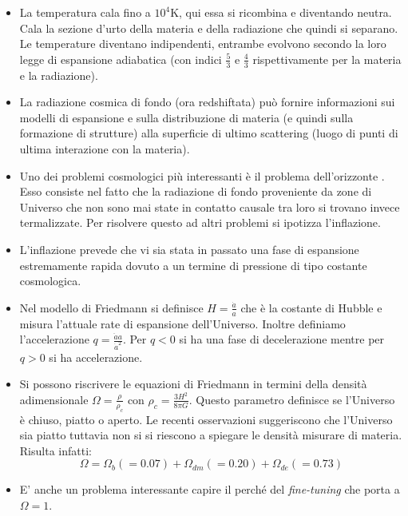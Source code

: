 \documentclass[11pt,a4paper]{article}
\begin{document}
\begin{itemize}
\item La temperatura cala fino a $10^4 \si{\kelvin}$, qui essa si ricombina e diventando neutra. Cala la sezione d'urto della materia e della radiazione che quindi si separano. Le temperature diventano indipendenti, entrambe evolvono secondo la loro legge di espansione adiabatica (con indici $\frac{5}{3}$ e $\frac{4}{3}$ rispettivamente per la materia e la radiazione).

\item La radiazione cosmica di fondo (ora redshiftata) può fornire informazioni sui modelli di espansione e sulla distribuzione di materia (e quindi sulla formazione di strutture) alla superficie di ultimo scattering (luogo di punti di ultima interazione con la materia). 

\item Uno dei problemi cosmologici più interessanti è il problema dell'orizzonte . Esso consiste nel fatto che la radiazione di fondo proveniente da zone di Universo che non sono mai state in contatto causale tra loro si trovano invece termalizzate. Per risolvere questo ad altri problemi si ipotizza l'inflazione.

\item L'inflazione prevede che vi sia stata in passato una fase di espansione estremamente rapida dovuto a un termine di pressione di tipo costante cosmologica.

\item Nel modello di Friedmann si definisce $H = \frac{\dot{a}}{a}$ che è la costante di Hubble e misura l'attuale rate di espansione dell'Universo. Inoltre definiamo l'accelerazione $q = \frac{\ddot{a} a}{\dot{a}^2}$. Per $q < 0$ si ha una fase di decelerazione mentre per $q > 0$ si ha accelerazione.

\item Si possono riscrivere le equazioni di Friedmann in termini della densità adimensionale $\Omega = \frac{\rho}{\rho_c}$ con $\rho_c = \frac{3 H^2}{8 \pi G}$. Questo parametro definisce se l'Universo è chiuso, piatto o aperto. Le recenti osservazioni suggeriscono che l'Universo sia piatto tuttavia non si si riescono a spiegare le densità misurare di materia. Risulta infatti:
\begin{equation}
\Omega = \Omega_b (= 0.07) + \Omega_{dm} ( = 0.20) + \Omega_{de} (=0.73)
\end{equation}

\item E' anche un problema interessante capire il perché del \textit{fine-tuning} che porta a $\Omega = 1$.

\end{itemize}
\end{document}
